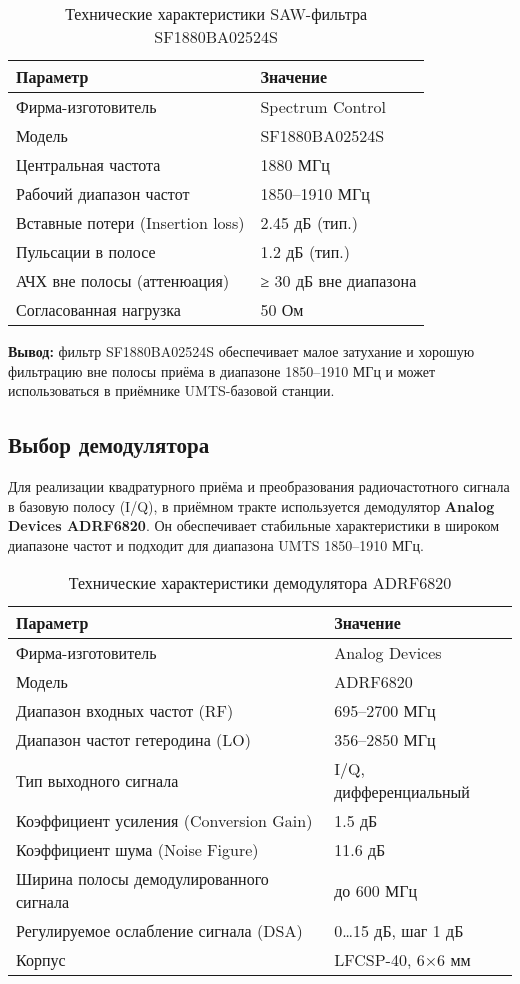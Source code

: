 \documentclass[a4paper,12pt]{article}
\begin{document}
\begin{table}[H]
\centering
\caption{Технические характеристики SAW-фильтра SF1880BA02524S}
\begin{tabular}{|l|l|}
\hline
\textbf{Параметр} & \textbf{Значение} \\ \hline
Фирма-изготовитель & Spectrum Control \\ \hline
Модель & SF1880BA02524S \\ \hline
Центральная частота & 1880 МГц \\ \hline
Рабочий диапазон частот & 1850–1910 МГц \\ \hline
Вставные потери (Insertion loss) & 2.45 дБ (тип.) \\ \hline
Пульсации в полосе & 1.2 дБ (тип.) \\ \hline
АЧХ вне полосы (аттенюация) & ≥ 30 дБ вне диапазона \\ \hline
Согласованная нагрузка & 50 Ом \\ \hline
\end{tabular}
\end{table}

\textbf{Вывод:} фильтр SF1880BA02524S обеспечивает малое затухание и хорошую фильтрацию вне полосы приёма в диапазоне 1850–1910 МГц и может использоваться в приёмнике UMTS-базовой станции.



\subsection{Выбор демодулятора}

Для реализации квадратурного приёма и преобразования радиочастотного сигнала в базовую полосу (I/Q), в приёмном тракте используется демодулятор \textbf{Analog Devices ADRF6820}. Он обеспечивает стабильные характеристики в широком диапазоне частот и подходит для диапазона UMTS 1850–1910 МГц.

\begin{table}[H]
\centering
\caption{Технические характеристики демодулятора ADRF6820}
\begin{tabular}{|l|l|}
\hline
\textbf{Параметр} & \textbf{Значение} \\ \hline
Фирма-изготовитель & Analog Devices \\ \hline
Модель & ADRF6820 \\ \hline
Диапазон входных частот (RF) & 695–2700 МГц \\ \hline
Диапазон частот гетеродина (LO) & 356–2850 МГц \\ \hline
Тип выходного сигнала & I/Q, дифференциальный \\ \hline
Коэффициент усиления (Conversion Gain) & 1.5 дБ \\ \hline
Коэффициент шума (Noise Figure) & 11.6 дБ \\ \hline
Ширина полосы демодулированного сигнала & до 600 МГц \\ \hline
Регулируемое ослабление сигнала (DSA) & 0…15 дБ, шаг 1 дБ \\ \hline
Корпус & LFCSP-40, 6×6 мм \\ \hline
\end{tabular}
\end{table}
\end{document}
